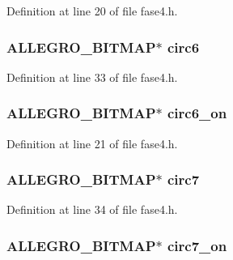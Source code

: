 Definition at line 20 of file fase4.\-h.

\hypertarget{struct_level_quatro_a727b47ddfdf73dd07d1a2832fc0f24f9}{
\subsubsection[{circ6}]{\setlength{\rightskip}{0pt plus 5cm}A\-L\-L\-E\-G\-R\-O\-\_\-\-B\-I\-T\-M\-A\-P$\ast$ circ6}}\label{struct_level_quatro_a727b47ddfdf73dd07d1a2832fc0f24f9}


Definition at line 33 of file fase4.\-h.

\hypertarget{struct_level_quatro_aa380bab7c5e4a7793500bc4563c4a6bd}{
\subsubsection[{circ6\-\_\-on}]{\setlength{\rightskip}{0pt plus 5cm}A\-L\-L\-E\-G\-R\-O\-\_\-\-B\-I\-T\-M\-A\-P$\ast$ circ6\-\_\-on}}\label{struct_level_quatro_aa380bab7c5e4a7793500bc4563c4a6bd}


Definition at line 21 of file fase4.\-h.

\hypertarget{struct_level_quatro_a4c8ba6392592a4e079c99008ad6e1e30}{
\subsubsection[{circ7}]{\setlength{\rightskip}{0pt plus 5cm}A\-L\-L\-E\-G\-R\-O\-\_\-\-B\-I\-T\-M\-A\-P$\ast$ circ7}}\label{struct_level_quatro_a4c8ba6392592a4e079c99008ad6e1e30}


Definition at line 34 of file fase4.\-h.

\hypertarget{struct_level_quatro_a120b206a58a11edb5fee11d79c1c2aa6}{
\subsubsection[{circ7\-\_\-on}]{\setlength{\rightskip}{0pt plus 5cm}A\-L\-L\-E\-G\-R\-O\-\_\-\-B\-I\-T\-M\-A\-P$\ast$ circ7\-\_\-on}}\label{struct_level_quatro_a120b206a58a11edb5fee11d79c1c2aa6}


